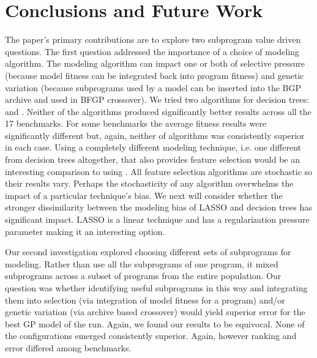 \section{Conclusions and Future Work}\label{sect:conc}

The paper's primary contributions are to explore two subprogram value driven questions.  The first question addressed the importance of a choice of modeling algorithm. The modeling algorithm can impact one or both of selective pressure (because model fitness can be integrated back into program fitness) and genetic variation (because subprograms used by a model can be inserted into the BGP archive and used in BFGP crossover).   We tried two algorithms for decision trees: \REPTREE and \SCIKIT. Neither of the algorithms produced significantly better results across all the 17 benchmarks.  For some benchmarks  the average fitness results were significantly different but, again, neither of algorithms was consistently superior in each case. 
Using a completely different modeling technique, i.e. one different from decision trees altogether,  that also provides feature selection would be an interesting comparison to using \REPTREE.  All feature selection algorithms are stochastic so their results vary. Perhaps the stochasticity of any algorithm overwhelms the impact of a particular technique's bias. We next will consider whether the stronger dissimilarity between the modeling bias of LASSO and decision trees has significant impact. LASSO is a linear technique and has a regularization pressure parameter making it an interesting option.


Our second investigation explored choosing different sets of subprograms for modeling. Rather than use all the subprograms of one program, it mixed subprograms across a subset of programs from the entire population. Our question was whether identifying useful subprograms in this way and integrating them into selection (via integration of model fitness for a program) and/or genetic variation (via archive based crossover) would yield superior error for the best GP model of the run.  Again, we found our results to be equivocal.  None of the configurations emerged consistently superior. Again, however ranking and error differed among benchmarks. 

